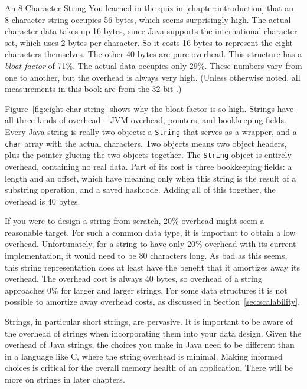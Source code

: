 \begin{example}{An 8-Character String}
 You learned in the quiz in \autoref{chapter:introduction} that an 8-character
 string occupies 56 bytes, which seems surprisingly high. The actual character data takes up 16
 bytes, since Java supports the international character set, which uses 2-bytes
 per character. So it costs 16 bytes to represent the eight characters
 themselves. The other 40 bytes are pure overhead. This structure has a
 \emph{bloat factor} of 71\%. The actual data occupies only 29\%. These numbers
 vary from one \jre to another, but the overhead is always very high. (Unless
 otherwise noted, all measurements in this book are from the 32-bit \oracle
 \javasix \jre.)

Figure~\ref{fig:eight-char-string} shows why the bloat factor is so high.
Strings have all three kinds of overhead -- JVM overhead, pointers, and
bookkeeping fields. Every Java string is really two objects: a {\tt String} that
serves as a wrapper, and a {\tt char} array with the actual characters. Two
objects means two object headers, plus the pointer glueing the two objects
together. The {\tt String} object is entirely overhead, containing no real data.
Part of its cost is three bookkeeping fields: a length and an offset, which have
meaning only when this string is the result of a substring operation, and a
saved hashcode. Adding all of this together, the overhead is 40 bytes.
\end{example}

If you were to design a string from scratch, 20\% overhead might seem a
reasonable target. For such a common data type, it is important to obtain a low
overhead.
Unfortunately, for a string to have only 20\% overhead with its current
implementation, it would need to be 80 characters long. As bad as this seems,
this string representation does at least have the benefit that it amortizes away
its overhead. The overhead cost is always 40 bytes, so overhead of a string
approaches 0\% for larger and larger strings.  For some data structures it is
not possible to amortize away overhead costs, as discussed in
Section~\ref{sec:scalability}.

Strings, in particular short strings, are pervasive. It is important to be aware
of the overhead of strings when incorporating them into your data design. Given
the overhead of Java strings, the choices you make in Java need to be different
than in a language like C, where the string overhead is minimal. Making informed
choices is critical for the overall memory health of an application. There will
be more on strings in later chapters.


